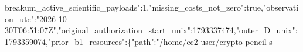 \documentclass[10pt]{article}
\begin{document}
break{}u\allowbreak{}m\allowbreak{}\_\allowbreak{}a\allowbreak{}c\allowbreak{}t\allowbreak{}i\allowbreak{}v\allowbreak{}e\allowbreak{}\_\allowbreak{}s\allowbreak{}c\allowbreak{}i\allowbreak{}e\allowbreak{}n\allowbreak{}t\allowbreak{}i\allowbreak{}f\allowbreak{}i\allowbreak{}c\allowbreak{}\_\allowbreak{}p\allowbreak{}a\allowbreak{}y\allowbreak{}l\allowbreak{}o\allowbreak{}a\allowbreak{}d\allowbreak{}s\allowbreak{}"\allowbreak{}:\allowbreak{}1\allowbreak{},\allowbreak{}"\allowbreak{}m\allowbreak{}i\allowbreak{}s\allowbreak{}s\allowbreak{}i\allowbreak{}n\allowbreak{}g\allowbreak{}\_\allowbreak{}c\allowbreak{}o\allowbreak{}s\allowbreak{}t\allowbreak{}s\allowbreak{}\_\allowbreak{}n\allowbreak{}o\allowbreak{}t\allowbreak{}\_\allowbreak{}z\allowbreak{}e\allowbreak{}r\allowbreak{}o\allowbreak{}"\allowbreak{}:\allowbreak{}t\allowbreak{}r\allowbreak{}u\allowbreak{}e\allowbreak{},\allowbreak{}"\allowbreak{}o\allowbreak{}b\allowbreak{}s\allowbreak{}e\allowbreak{}r\allowbreak{}v\allowbreak{}a\allowbreak{}t\allowbreak{}i\allowbreak{}o\allowbreak{}n\allowbreak{}\_\allowbreak{}u\allowbreak{}t\allowbreak{}c\allowbreak{}"\allowbreak{}:\allowbreak{}"\allowbreak{}2\allowbreak{}0\allowbreak{}2\allowbreak{}6\allowbreak{}-\allowbreak{}1\allowbreak{}0\allowbreak{}-\allowbreak{}3\allowbreak{}0\allowbreak{}T\allowbreak{}0\allowbreak{}6\allowbreak{}:\allowbreak{}5\allowbreak{}1\allowbreak{}:\allowbreak{}0\allowbreak{}7\allowbreak{}Z\allowbreak{}"\allowbreak{},\allowbreak{}"\allowbreak{}o\allowbreak{}r\allowbreak{}i\allowbreak{}g\allowbreak{}i\allowbreak{}n\allowbreak{}a\allowbreak{}l\allowbreak{}\_\allowbreak{}a\allowbreak{}u\allowbreak{}t\allowbreak{}h\allowbreak{}o\allowbreak{}r\allowbreak{}i\allowbreak{}z\allowbreak{}a\allowbreak{}t\allowbreak{}i\allowbreak{}o\allowbreak{}n\allowbreak{}\_\allowbreak{}s\allowbreak{}t\allowbreak{}a\allowbreak{}r\allowbreak{}t\allowbreak{}\_\allowbreak{}u\allowbreak{}n\allowbreak{}i\allowbreak{}x\allowbreak{}"\allowbreak{}:\allowbreak{}1\allowbreak{}7\allowbreak{}9\allowbreak{}3\allowbreak{}3\allowbreak{}3\allowbreak{}7\allowbreak{}4\allowbreak{}7\allowbreak{}4\allowbreak{},\allowbreak{}"\allowbreak{}o\allowbreak{}u\allowbreak{}t\allowbreak{}e\allowbreak{}r\allowbreak{}\_\allowbreak{}D\allowbreak{}\_\allowbreak{}u\allowbreak{}n\allowbreak{}i\allowbreak{}x\allowbreak{}"\allowbreak{}:\allowbreak{}1\allowbreak{}7\allowbreak{}9\allowbreak{}3\allowbreak{}3\allowbreak{}5\allowbreak{}9\allowbreak{}0\allowbreak{}7\allowbreak{}4\allowbreak{},\allowbreak{}"\allowbreak{}p\allowbreak{}r\allowbreak{}i\allowbreak{}o\allowbreak{}r\allowbreak{}\_\allowbreak{}b\allowbreak{}1\allowbreak{}\_\allowbreak{}r\allowbreak{}e\allowbreak{}s\allowbreak{}o\allowbreak{}u\allowbreak{}r\allowbreak{}c\allowbreak{}e\allowbreak{}s\allowbreak{}"\allowbreak{}:\allowbreak{}\{\allowbreak{}"\allowbreak{}p\allowbreak{}a\allowbreak{}t\allowbreak{}h\allowbreak{}"\allowbreak{}:\allowbreak{}"\allowbreak{}/\allowbreak{}h\allowbreak{}o\allowbreak{}m\allowbreak{}e\allowbreak{}/\allowbreak{}e\allowbreak{}c\allowbreak{}2\allowbreak{}-\allowbreak{}u\allowbreak{}s\allowbreak{}e\allowbreak{}r\allowbreak{}/\allowbreak{}c\allowbreak{}r\allowbreak{}y\allowbreak{}p\allowbreak{}t\allowbreak{}o\allowbreak{}-\allowbreak{}p\allowbreak{}e\allowbreak{}n\allowbreak{}c\allowbreak{}i\allowbreak{}l\allowbreak{}-\allowbreak{}s\allowbre
\end{document}
